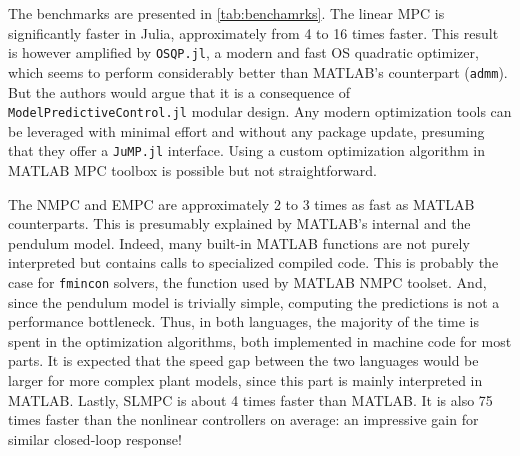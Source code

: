 The benchmarks are presented in \cref{tab:benchamrks}. The linear MPC is significantly faster in Julia, approximately from 4 to 16 times faster. This result is however amplified by \texttt{OSQP.jl}, a modern and fast OS quadratic optimizer, which seems to perform considerably better than MATLAB's counterpart (\texttt{admm}). But the authors would argue that it is a consequence of \texttt{ModelPredictiveControl.jl} modular design. Any modern optimization tools can be leveraged with minimal effort and without any package update, presuming that they offer a \texttt{JuMP.jl} interface. Using a custom optimization algorithm in MATLAB MPC toolbox is possible but not straightforward.

The NMPC and EMPC are approximately 2 to 3 times as fast as MATLAB counterparts. This is presumably explained by MATLAB's internal and the pendulum model. Indeed, many built-in MATLAB functions are not purely interpreted but contains calls to specialized compiled code. This is probably the case for \texttt{fmincon} solvers, the function used by MATLAB NMPC toolset. And, since the pendulum model is trivially simple, computing the predictions is not a performance bottleneck. Thus, in both languages, the majority of the time is spent in the optimization algorithms, both implemented in machine code for most parts. It is expected that the speed gap between the two languages would be larger for more complex plant models, since this part is mainly interpreted in MATLAB. Lastly, SLMPC is about 4 times faster than MATLAB. It is also 75 times faster than the nonlinear controllers on average: an impressive gain for similar closed-loop response!